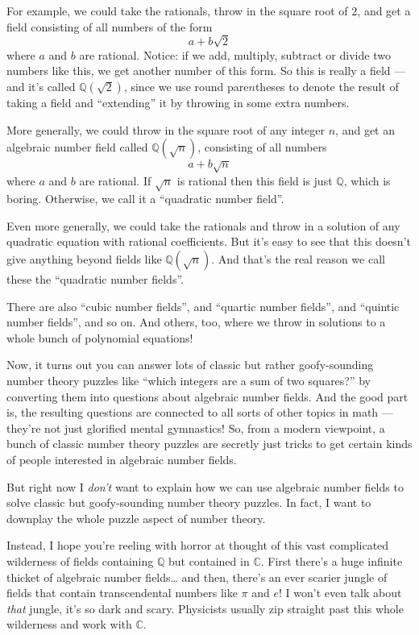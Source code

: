 \documentclass{article}
\begin{document}
For example, we could take the rationals, throw in the square root of
\(2\), and get a field consisting of all numbers of the form
\[a + b \sqrt{2}\] where \(a\) and \(b\) are rational. Notice: if we
add, multiply, subtract or divide two numbers like this, we get another
number of this form. So this is really a field --- and it's called
\(\mathbb{Q}(\sqrt{2})\), since we use round pare\(n\)theses to denote
the result of taking a field and ``extending'' it by throwing in some
extra numbers.

More generally, we could throw in the square root of any integer \(n\),
and get an algebraic number field called \(\mathbb{Q}(\sqrt{n})\),
consisting of all numbers \[a + b \sqrt{n}\] where \(a\) and \(b\) are
rational. If \(\sqrt{n}\) is rational then this field is just
\(\mathbb{Q}\), which is boring. Otherwise, we call it a ``quadratic
number field''.

Even more generally, we could take the rationals and throw in a solution
of any quadratic equation with rational coefficients. But it's easy to
see that this doesn't give anything beyond fields like
\(\mathbb{Q}(\sqrt{n})\). And that's the real reason we call these the
``quadratic number fields''.

There are also ``cubic number fields'', and ``quartic number fields'',
and ``quintic number fields'', and so on. And others, too, where we
throw in solutions to a whole bunch of polynomial equations!

Now, it turns out you can answer lots of classic but rather
goofy-sounding number theory puzzles like ``which integers are a sum of
two squares?'' by converting them into questions about algebraic number
fields. And the good part is, the resulting questions are connected to
all sorts of other topics in math --- they're not just glorified mental
gymnastics! So, from a modern viewpoint, a bunch of classic number
theory puzzles are secretly just tricks to get certain kinds of people
interested in algebraic number fields.

But right now I \emph{don't} want to explain how we can use algebraic
number fields to solve classic but goofy-sounding number theory puzzles.
In fact, I want to downplay the whole puzzle aspect of number theory.

Instead, I hope you're reeling with horror at thought of this vast
complicated wilderness of fields containing \(\mathbb{Q}\) but contained
in \(\mathbb{C}\). First there's a huge infinite thicket of algebraic
number fields\ldots{} and then, there's an ever scarier jungle of fields
that contain transcendental numbers like \(\pi\) and \(e\)! I won't even
talk about \emph{that} jungle, it's so dark and scary. Physicists
usually zip straight past this whole wilderness and work with
\(\mathbb{C}\).
\end{document}
